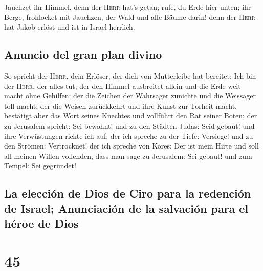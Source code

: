 Jauchzet ihr Himmel, denn der \textsc{Herr} hat's getan;
rufe, du Erde hier unten; ihr Berge, frohlocket mit Jauchzen, der Wald
und alle Bäume darin! denn der \textsc{Herr} hat Jakob erlöst und ist in
Israel herrlich.

\hypertarget{anuncio-del-gran-plan-divino}{%
\subsection{Anuncio del gran plan
divino}\label{anuncio-del-gran-plan-divino}}

 So spricht der \textsc{Herr}, dein Erlöser, der dich von
Mutterleibe hat bereitet: Ich bin der \textsc{Herr}, der alles tut, der
den Himmel ausbreitet allein und die Erde weit macht ohne Gehilfen;
 der die Zeichen der Wahrsager zunichte und die Weissager
toll macht; der die Weisen zurückkehrt und ihre Kunst zur Torheit macht,
 bestätigt aber das Wort seines Knechtes und vollführt
den Rat seiner Boten; der zu Jerusalem spricht: Sei bewohnt! und zu den
Städten Judas: Seid gebaut! und ihre Verwüstungen richte ich auf;
 der ich spreche zu der Tiefe: Versiege! und zu den
Strömen: Vertrocknet!  der ich spreche von Kores: Der ist
mein Hirte und soll all meinen Willen vollenden, dass man sage zu
Jerusalem: Sei gebaut! und zum Tempel: Sei gegründet!

\hypertarget{la-elecciuxf3n-de-dios-de-ciro-para-la-redenciuxf3n-de-israel-anunciaciuxf3n-de-la-salvaciuxf3n-para-el-huxe9roe-de-dios}{%
\subsection{La elección de Dios de Ciro para la redención de Israel;
Anunciación de la salvación para el héroe de
Dios}\label{la-elecciuxf3n-de-dios-de-ciro-para-la-redenciuxf3n-de-israel-anunciaciuxf3n-de-la-salvaciuxf3n-para-el-huxe9roe-de-dios}}

\hypertarget{section-44}{%
\section{45}\label{section-44}}

